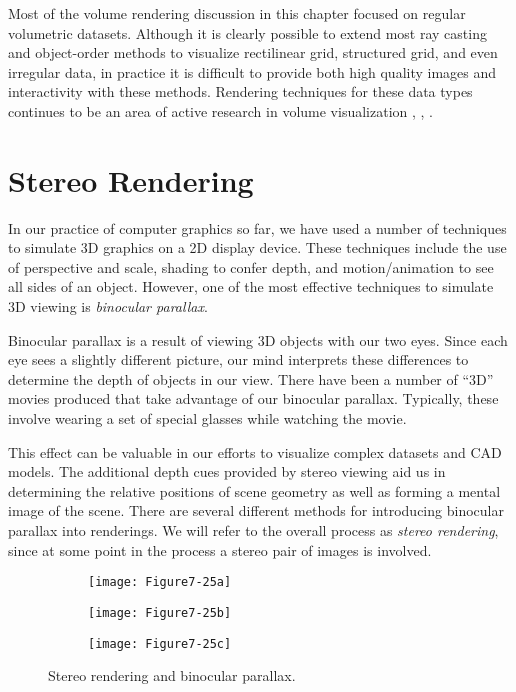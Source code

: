 Most of the volume rendering discussion in this chapter focused on regular volumetric datasets. Although it is clearly possible to extend most ray casting and object-order methods to visualize rectilinear grid, structured grid, and even irregular data, in practice it is difficult to provide both high quality images and interactivity with these methods. Rendering techniques for these data types continues to be an area of active research in volume visualization \cite{Cignoni96}, \cite{Silva96}, \cite{Wilhelms96}.

\section{Stereo Rendering}

In our practice of computer graphics so far, we have used a number of techniques to simulate 3D graphics on a 2D display device. These techniques include the use of perspective and scale, shading to confer depth, and motion/animation to see all sides of an object. However, one of the most effective techniques to simulate 3D viewing is \emph{binocular parallax}.

Binocular parallax is a result of viewing 3D objects with our two eyes. Since each eye sees a slightly different picture, our mind interprets these differences to determine the depth of objects in our view. There have been a number of ``3D'' movies produced that take advantage of our binocular parallax. Typically, these involve wearing a set of special glasses while watching the movie.

This effect can be valuable in our efforts to visualize complex datasets and CAD models. The additional depth cues provided by stereo viewing aid us in determining the relative positions of scene geometry as well as forming a mental image of the scene. There are several different methods for introducing binocular parallax into renderings. We will refer to the overall process as \emph{stereo rendering}, since at some point in the process a stereo pair of images is involved.

\begin{figure}[!htb]
	\centering
	\begin{subfigure}{0.32\linewidth}
		\centering
		\texttt{[image: Figure7-25a]}
		\caption*{}\label{fig:Figure7-25a}
	\end{subfigure}
	\hfill
	\begin{subfigure}{0.32\linewidth}
		\centering
		\texttt{[image: Figure7-25b]}
		\caption*{}\label{fig:Figure7-25b}
	\end{subfigure}%
	\hfill
	\begin{subfigure}{0.32\linewidth}
		\centering
		\texttt{[image: Figure7-25c]}
		\caption*{}\label{fig:Figure7-25c}
	\end{subfigure}%
	\caption{Stereo rendering and binocular parallax.}
	\label{fig:Figure7-25}
\end{figure}

